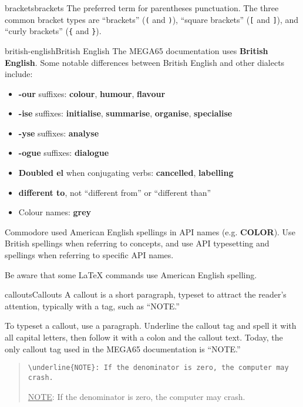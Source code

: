 \begin{sgentry}{brackets}{brackets}
    The preferred term for parentheses punctuation. The three common bracket types are ``brackets'' (\texttt{(} and \texttt{)}), ``square brackets'' (\texttt{[} and \texttt{]}), and ``curly brackets'' (\texttt{\{} and \texttt{\}}).
\end{sgentry}

\begin{sgentry}{british-english}{British English}
    The MEGA65 documentation uses \textbf{British English}. Some notable differences between British English and other dialects include:

    \begin{itemize}
        \item \textbf{-our} suffixes: \textbf{colour}, \textbf{humour}, \textbf{flavour}
        \item \textbf{-ise} suffixes: \textbf{initialise}, \textbf{summarise}, \textbf{organise}, \textbf{specialise}
        \item \textbf{-yse} suffixes: \textbf{analyse}
        \item \textbf{-ogue} suffixes: \textbf{dialogue}
        \item \textbf{Doubled el} when conjugating verbs: \textbf{cancelled}, \textbf{labelling}
        \item \textbf{different to}, not ``different from'' or ``different than''
        \item Colour names: \textbf{grey}
    \end{itemize}

    Commodore used American English spellings in API names (e.g. \textbf{COLOR}). Use British spellings when referring to concepts, and use API typesetting and spellings when referring to specific API names.

    Be aware that some LaTeX commands use American English spelling.
\end{sgentry}

\begin{sgentry}{callouts}{Callouts}
    A callout is a short paragraph, typeset to attract the reader's attention, typically with a tag, such as ``NOTE.''

    To typeset a callout, use a paragraph. Underline the callout tag and spell it with all capital letters, then follow it with a colon and the callout text. Today, the only callout tag used in the MEGA65 documentation is ``NOTE.''

    \begin{quote}
        \texttt{{\textbackslash}underline\{NOTE\}: If the denominator is zero, the computer may crash.}

        \hrulefill

        \underline{NOTE}: If the denominator is zero, the computer may crash.
    \end{quote}
\end{sgentry}

